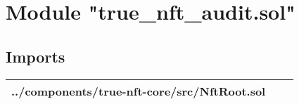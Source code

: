 
\section{Module "true\_{}nft\_{}audit.sol"}


\subsection{Imports}


\noindent\begin{tabular}{|l|l|p{5cm}|}\hline
../components/true-nft-core/src/NftRoot.sol &\\\hline
\end{tabular}

